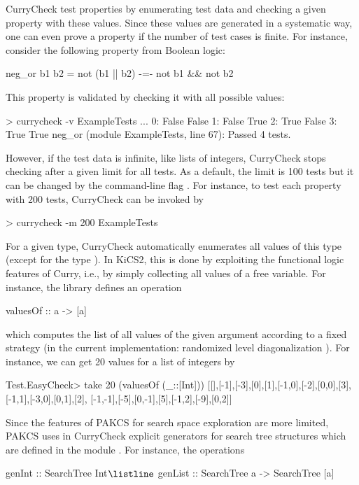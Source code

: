 CurryCheck test properties by enumerating test data and
checking a given property with these values.
Since these values are generated in a systematic way,
one can even prove a property if the number of test cases
is finite. For instance, consider the following property
from Boolean logic:
\begin{curry}
neg_or b1 b2 = not (b1 || b2) -=- not b1 && not b2
\end{curry}
This property is validated by checking it with all possible values:
%
\begin{curry}
> currycheck -v ExampleTests
...
0:
False
False
1:
False
True
2:
True
False
3:
True
True
neg_or (module ExampleTests, line 67):
 Passed 4 tests.
\end{curry}
%
However, if the test data is infinite, like lists of integers,
CurryCheck stops checking after a given limit for all tests.
As a default, the limit is 100 tests but it can be changed
by the command-line flag . For instance, to test
each property with 200 tests, CurryCheck can be invoked by
%
\begin{curry}
> currycheck -m 200 ExampleTests
\end{curry}
%
For a given type, CurryCheck automatically enumerates all values
of this type (except for the type ).
In KiCS2, this is done by exploiting the functional logic features
of Curry, i.e., by simply collecting all values of a free variable.
For instance, the library  defines an operation
\begin{curry}
valuesOf :: a -> [a]
\end{curry}
which computes the list of all values of the given argument
according to a fixed strategy (in the current implementation:
randomized level diagonalization \cite{ChristiansenFischer08FLOPS}).
For instance, we can get 20 values for a list of integers by
%
\begin{curry}
Test.EasyCheck> take 20 (valuesOf (_::[Int]))
[[],[-1],[-3],[0],[1],[-1,0],[-2],[0,0],[3],[-1,1],[-3,0],[0,1],[2],
[-1,-1],[-5],[0,-1],[5],[-1,2],[-9],[0,2]]
\end{curry}
%
Since the features of PAKCS for search space exploration are more limited,
PAKCS uses in CurryCheck explicit generators for search tree structures
which are defined in the module .
For instance, the operations
%
\begin{curry}
genInt :: SearchTree Int$\listline$
genList :: SearchTree a -> SearchTree [a]
\end{curry}
